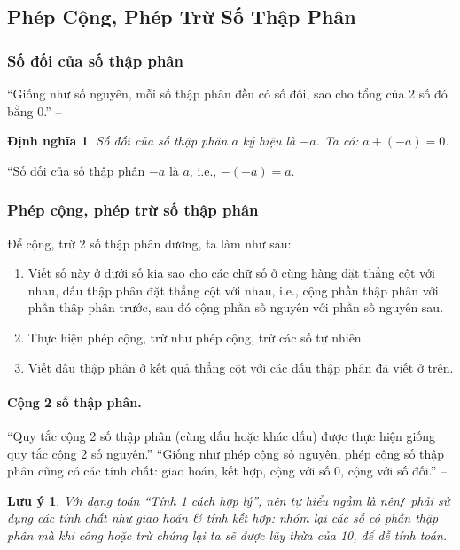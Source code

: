 \documentclass{article}
\numberwithin{equation}{section}
\newtheorem{definition}{Định nghĩa}[section]
\newtheorem{remark}{Lưu ý}[section]
\begin{document}
\subsection{Phép Cộng, Phép Trừ Số Thập Phân}

\subsubsection{Số đối của số thập phân}
``Giống như số nguyên, mỗi số thập phân đều có số đối, sao cho tổng của 2 số đó bằng 0.'' -- \cite[p. 48]{Thai_Anh_Dat_Ha_Loan_Nam_Quang_Toan_6_tap_2}

\begin{definition}
	\emph{Số đối} của số thập phân $a$ ký hiệu là $-a$. Ta có: $a + (-a) = 0$.
\end{definition}
``Số đối của số thập phân $-a$ là $a$, i.e., $-(-a) = a$.

\subsubsection{Phép cộng, phép trừ số thập phân}
Để cộng, trừ 2 số thập phân dương, ta làm như sau:
\begin{enumerate}
	\item Viết số này ở dưới số kia sao cho các chữ số ở cùng hàng đặt thẳng cột với nhau, dấu thập phân đặt thẳng cột với nhau, i.e., cộng phần thập phân với phần thập phân trước, sau đó cộng phần số nguyên với phần số nguyên sau.
	\item Thực hiện phép cộng, trừ như phép cộng, trừ các số tự nhiên.
	\item Viết dấu thập phân ở kết quả thẳng cột với các dấu thập phân đã viết ở trên.
\end{enumerate}

\paragraph{Cộng 2 số thập phân.} ``Quy tắc cộng 2 số thập phân (cùng dấu hoặc khác dấu) được thực hiện giống quy tắc cộng 2 số nguyên.'' ``Giống như phép cộng số nguyên, phép cộng số thập phân cũng có các tính chất: giao hoán, kết hợp, cộng với số 0, cộng với số đối.'' -- \cite[p. 49]{Thai_Anh_Dat_Ha_Loan_Nam_Quang_Toan_6_tap_2}

\begin{remark}
	Với dạng toán ``Tính 1 cách hợp lý'', nên tự hiểu ngầm là nên\emph{\texttt{/}} phải sử dụng các tính chất như giao hoán \textit{\&} tính kết hợp: nhóm lại các số có phần thập phân mà khi công hoặc trừ chúng lại ta sẽ được lũy thừa của 10, để dễ tính toán.
\end{remark}
\end{document}
